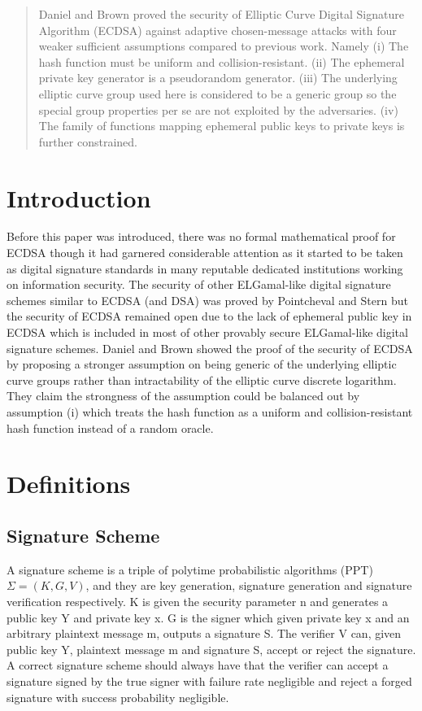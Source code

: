 \documentclass[18]{article}
\begin{document}
\maketitle

\begin{abstract}
Daniel and  Brown proved the security of Elliptic Curve Digital Signature Algorithm (ECDSA) against adaptive chosen-message attacks with four weaker sufficient assumptions compared to previous work. Namely (i) The hash function must be uniform and collision-resistant. (ii) The ephemeral private key generator is a pseudorandom generator. (iii) The underlying elliptic curve group used here is considered to be a generic group so the special group properties per se are not exploited by the adversaries. (iv) The family of functions mapping ephemeral public keys to private keys is further constrained.
\cite{Brown2005}
\end{abstract}

\section{Introduction}
Before this paper was introduced, there was no formal mathematical proof for ECDSA though it had garnered considerable attention as it started to be taken as digital signature standards in many reputable dedicated institutions working on information security. The security of other ELGamal-like digital signature schemes similar to ECDSA (and DSA) was proved by Pointcheval and Stern but the security of ECDSA remained open due to the lack of ephemeral public key in ECDSA which is included in most of other provably secure ELGamal-like digital signature schemes. Daniel and Brown showed the proof of the security of ECDSA by proposing a stronger assumption on being generic of the underlying elliptic curve groups rather than intractability of the elliptic curve discrete logarithm. They claim the strongness of the assumption could be balanced out by assumption (i) which treats the hash function as a uniform and collision-resistant hash function instead of a random oracle.

\section{Definitions}
\subsection{Signature Scheme}
A signature scheme is a triple of polytime probabilistic algorithms (PPT)
$\Sigma=(K,G,V)$, and they are key generation, signature generation and signature verification respectively. K is given the security parameter n
and generates a public key Y and private key x.
G is the signer which given private key x and an arbitrary plaintext message m, outputs a signature S. The verifier V can,
given public key Y, plaintext message m and signature S, accept or reject the signature.
A correct signature scheme should always have that the verifier can accept a signature signed by the true signer with failure rate negligible and reject a forged signature with success probability negligible.
\end{document}
